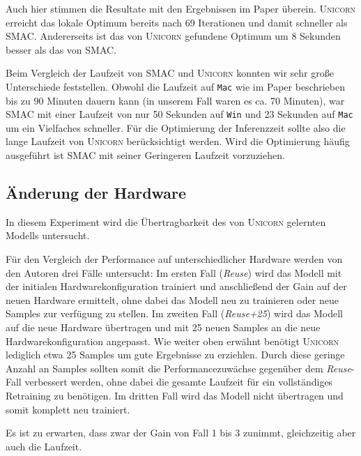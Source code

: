 \documentclass[11pt]{article}
\begin{document}
Auch hier stimmen die Resultate mit den Ergebnissen im Paper überein. \textsc{Unicorn} erreicht das lokale Optimum bereits nach 69 Iterationen und damit schneller als SMAC. Andererseits ist das von \textsc{Unicorn} gefundene Optimum um 8 Sekunden besser als das von SMAC.

Beim Vergleich der Laufzeit von SMAC und \textsc{Unicorn} konnten wir sehr große Unterschiede feststellen. Obwohl die Laufzeit auf \texttt{Mac} wie im Paper beschrieben bis zu 90 Minuten dauern kann (in unserem Fall waren es ca. 70 Minuten), war SMAC mit einer Laufzeit von nur 50 Sekunden auf \texttt{Win} und 23 Sekunden auf \texttt{Mac} um ein Vielfaches schneller. Für die Optimierung der Inferenzzeit sollte also die lange Laufzeit von \textsc{Unicorn} berücksichtigt werden. Wird die Optimierung häufig ausgeführt ist SMAC mit seiner Geringeren Laufzeit vorzuziehen.

\subsection{Änderung der Hardware}

In diesem Experiment wird die Übertragbarkeit des von \textsc{Unicorn} gelernten Modells untersucht.

Für den Vergleich der Performance auf unterschiedlicher Hardware werden von den Autoren drei Fälle untersucht: Im ersten Fall (\textit{Reuse}) wird das Modell mit der initialen Hardwarekonfiguration trainiert und anschließend der Gain auf der neuen Hardware ermittelt, ohne dabei das Modell neu zu trainieren oder neue Samples zur verfügung zu stellen. Im zweiten Fall (\textit{Reuse+25}) wird das Modell auf die neue Hardware übertragen und mit 25 neuen Samples an die neue Hardwarekonfiguration angepasst. Wie weiter oben erwähnt benötigt \textsc{Unicorn} lediglich etwa 25 Samples um gute Ergebnisse zu erziehlen. Durch diese geringe Anzahl an Samples sollten somit die Performancezuwächse gegenüber dem \textit{Reuse}-Fall verbessert werden, ohne dabei die gesamte Laufzeit für ein vollständiges Retraining zu benötigen. Im dritten Fall wird das Modell nicht übertragen und somit komplett neu trainiert.

Es ist zu erwarten, dass zwar der Gain von Fall 1 bis 3 zunimmt, gleichzeitig aber auch die Laufzeit.
\end{document}
